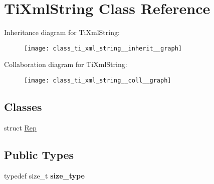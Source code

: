 \hypertarget{class_ti_xml_string}{\section{\-Ti\-Xml\-String \-Class \-Reference}
\label{class_ti_xml_string}
}


\-Inheritance diagram for \-Ti\-Xml\-String\-:\nopagebreak
\begin{figure}[H]
\begin{center}
\leavevmode
\texttt{[image: class\_ti\_xml\_string\_\_inherit\_\_graph]}
\end{center}
\end{figure}


\-Collaboration diagram for \-Ti\-Xml\-String\-:
\nopagebreak
\begin{figure}[H]
\begin{center}
\leavevmode
\texttt{[image: class\_ti\_xml\_string\_\_coll\_\_graph]}
\end{center}
\end{figure}
\subsection*{\-Classes}
\begin{DoxyCompactItemize}
\item 
struct \hyperlink{struct_ti_xml_string_1_1_rep}{\-Rep}
\end{DoxyCompactItemize}
\subsection*{\-Public \-Types}
\begin{DoxyCompactItemize}
\item 
\hypertarget{class_ti_xml_string_abeb2c1893a04c17904f7c06546d0b971}{typedef size\-\_\-t {\bfseries size\-\_\-type}}\label{class_ti_xml_string_abeb2c1893a04c17904f7c06546d0b971}

\end{DoxyCompactItemize}
